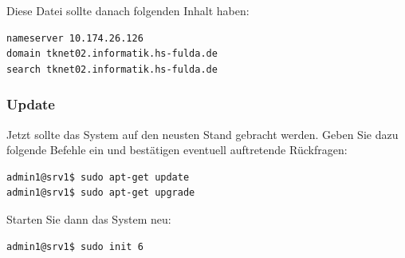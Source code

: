 Diese Datei sollte danach folgenden Inhalt haben:
\begin{lstlisting}
nameserver 10.174.26.126
domain tknet02.informatik.hs-fulda.de
search tknet02.informatik.hs-fulda.de
\end{lstlisting}

\subsubsection{Update}
Jetzt sollte das System auf den neusten Stand gebracht werden. Geben Sie dazu folgende Befehle ein und bestätigen eventuell auftretende Rückfragen:
\begin{lstlisting}
admin1@srv1$ sudo apt-get update
admin1@srv1$ sudo apt-get upgrade
\end{lstlisting}
Starten Sie dann das System neu:
\begin{lstlisting}
admin1@srv1$ sudo init 6
\end{lstlisting}